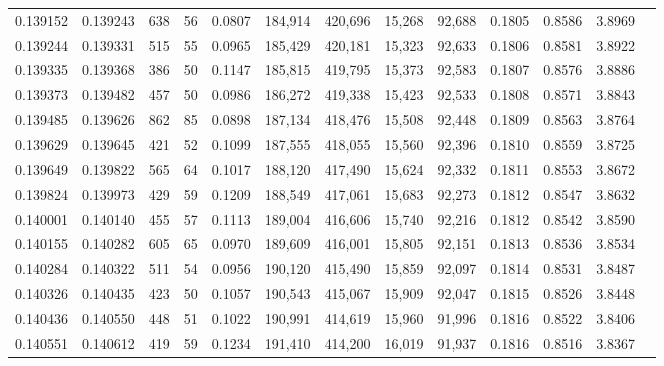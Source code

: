 \begin{tabular}{rrrrrrrrrrrrr}
0.139152 & 0.139243 &   638 &  56 &                                     0.0807 & 184,914 & 420,696 &  15,268 &  92,688 & 0.1805 & 0.8586 & 3.8969 \\
0.139244 & 0.139331 &   515 &  55 &                                     0.0965 & 185,429 & 420,181 &  15,323 &  92,633 & 0.1806 & 0.8581 & 3.8922 \\
0.139335 & 0.139368 &   386 &  50 &                                     0.1147 & 185,815 & 419,795 &  15,373 &  92,583 & 0.1807 & 0.8576 & 3.8886 \\
0.139373 & 0.139482 &   457 &  50 &                                     0.0986 & 186,272 & 419,338 &  15,423 &  92,533 & 0.1808 & 0.8571 & 3.8843 \\
0.139485 & 0.139626 &   862 &  85 &                                     0.0898 & 187,134 & 418,476 &  15,508 &  92,448 & 0.1809 & 0.8563 & 3.8764 \\
0.139629 & 0.139645 &   421 &  52 &                                     0.1099 & 187,555 & 418,055 &  15,560 &  92,396 & 0.1810 & 0.8559 & 3.8725 \\
0.139649 & 0.139822 &   565 &  64 &                                     0.1017 & 188,120 & 417,490 &  15,624 &  92,332 & 0.1811 & 0.8553 & 3.8672 \\
0.139824 & 0.139973 &   429 &  59 &                                     0.1209 & 188,549 & 417,061 &  15,683 &  92,273 & 0.1812 & 0.8547 & 3.8632 \\
0.140001 & 0.140140 &   455 &  57 &                                     0.1113 & 189,004 & 416,606 &  15,740 &  92,216 & 0.1812 & 0.8542 & 3.8590 \\
0.140155 & 0.140282 &   605 &  65 &                                     0.0970 & 189,609 & 416,001 &  15,805 &  92,151 & 0.1813 & 0.8536 & 3.8534 \\
0.140284 & 0.140322 &   511 &  54 &                                     0.0956 & 190,120 & 415,490 &  15,859 &  92,097 & 0.1814 & 0.8531 & 3.8487 \\
0.140326 & 0.140435 &   423 &  50 &                                     0.1057 & 190,543 & 415,067 &  15,909 &  92,047 & 0.1815 & 0.8526 & 3.8448 \\
0.140436 & 0.140550 &   448 &  51 &                                     0.1022 & 190,991 & 414,619 &  15,960 &  91,996 & 0.1816 & 0.8522 & 3.8406 \\
0.140551 & 0.140612 &   419 &  59 &                                     0.1234 & 191,410 & 414,200 &  16,019 &  91,937 & 0.1816 & 0.8516 & 3.8367 \\

\end{tabular}
